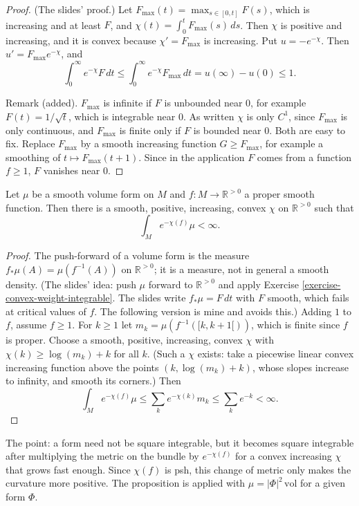 \begin{proof}
(The slides' proof.) Let
$F_{\max}(t)=\max_{s\in[0,t]}F(s)$, which is
increasing and at least $F$, and
$\chi(t)=\int_0^tF_{\max}(s)\,ds$. Then
$\chi$ is positive and increasing, and it is
convex because $\chi'=F_{\max}$ is
increasing. Put $u=-e^{-\chi}$. Then
$u'=F_{\max}e^{-\chi}$, and
$$
\int_0^\infty e^{-\chi}F\,dt\leq
\int_0^\infty e^{-\chi}F_{\max}\,dt
=u(\infty)-u(0)\leq1 .
$$

Remark (added). $F_{\max}$ is infinite if $F$
is unbounded near $0$, for example
$F(t)=1/\sqrt t$, which is integrable near
$0$. As written $\chi$ is only $C^1$, since
$F_{\max}$ is only continuous, and $F_{\max}$
is finite only if $F$ is bounded near $0$.
Both are easy to fix. Replace $F_{\max}$ by a
smooth increasing function $G\geq F_{\max}$,
for example a smoothing of $t\mapsto
F_{\max}(t+1)$. Since in the application $F$
comes from a function $f\geq1$, $F$ vanishes
near $0$.
\end{proof}

\begin{proposition}
\label{proposition-weight-integrable}
Let $\mu$ be a smooth volume form on $M$ and
$f\colon M\to\mathbb{R}^{>0}$ a proper smooth
function. Then there is a smooth, positive,
increasing, convex $\chi$ on
$\mathbb{R}^{>0}$ such that
$$
\int_Me^{-\chi(f)}\mu<\infty .
$$
\end{proposition}

\begin{proof}
The push-forward of a volume form is the
measure $f_*\mu(A)=\mu(f^{-1}(A))$ on
$\mathbb{R}^{>0}$; it is a measure, not in
general a smooth density. (The slides' idea:
push $\mu$ forward to $\mathbb{R}^{>0}$ and
apply Exercise
\ref{exercise-convex-weight-integrable}. The
slides write $f_*\mu=F\,dt$ with $F$ smooth,
which fails at critical values of $f$. The
following version is mine and avoids this.)
Adding $1$ to $f$, assume $f\geq1$. For
$k\geq1$ let $m_k=\mu(f^{-1}([k,k+1[))$,
which is finite since $f$ is proper. Choose a
smooth, positive, increasing, convex $\chi$
with $\chi(k)\geq\log(m_k)+k$ for all $k$.
(Such a $\chi$ exists: take a piecewise
linear convex increasing function above the
points $(k,\log(m_k)+k)$, whose slopes
increase to infinity, and smooth its
corners.) Then
$$
\int_Me^{-\chi(f)}\mu\leq
\sum_k e^{-\chi(k)}m_k\leq
\sum_k e^{-k}<\infty .
$$
\end{proof}

\noindent
The point: a form need not
be square integrable, but it becomes square
integrable after multiplying the metric on
the bundle by $e^{-\chi(f)}$ for a convex
increasing $\chi$ that grows fast enough.
Since $\chi(f)$ is psh, this change of metric
only makes the curvature more positive. The
proposition is applied with
$\mu=|\Phi|^2\,\mathrm{vol}$ for a given form
$\Phi$.

